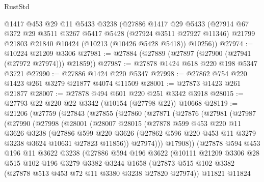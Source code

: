 \begin{lexlean}{RustStd}
\begin{coremodule}
    @1417
    @453
    @29
    @11
    @5433
    @3238
    (@27886
      @1417
      @29
      @5433
      (@27914
        @67
        @372
        @29
        @3511
        @3267
        @5417
        @5428
        (@27924 @3511 @27927 @11346)
        @21799
        @21803
        @21840
        @10424
        (@10213 (@10426 @5428 @5418))
        @10256))
@27974 := @10224 @21209 @3306
@27981 := @27884 (@27889 (@27897 (@27900 (@27941 (@27972 @27974))) @21859))
@27987 := @27878 @1424 @618 @220 @198 @5347 @3721
@27990 := @27886 @1424 @220 @5347
@27998 := @27862 @754 @220 @1423 @261 @3279 @21877 @4074 @11509
@28001 := @27873 @1423 @261 @21877
@28007 := @27878 @494 @601 @220 @251 @3342 @3918
@28015 := @27793 @22 @220 @22 @3342 (@10154 (@27798 @22)) @10668
@28119 := @21206
    (@27759
      (@27843
        (@27855
          (@27860
            (@27871
              (@27876
                (@27981
                  (@27987
                    (@27990
                      (@27998
                        (@28001
                          (@28007
                            @28015
                            (@27878
                              @599
                              @453
                              @220
                              @11
                              @3626
                              @3238
                              (@27886
                                @599
                                @220
                                @3626
                                (@27862 @596 @220 @453 @11 @3279 @3238 @3624 @10631 @27823 @11856))
                              @27974)))
                        @17908))
                    (@27878
                      @594
                      @453
                      @196
                      @11
                      @3622
                      @3238
                      (@27886
                        @594
                        @196
                        @3622
                        (@10111
                          @21209
                          @3306
                          @28
                          @515
                          @102
                          @196
                          @3279
                          @3382
                          @3244
                          @1658
                          (@27873
                            @515
                            @102
                            @3382
                            (@27878 @513 @453 @72 @11 @3380 @3238 @27820 @27974))
                          @11821
                          @11824

\end{coremodule}
\end{lexlean}

